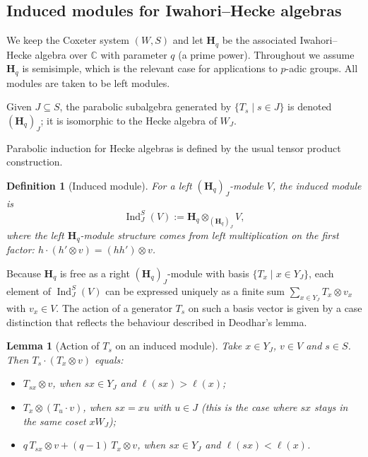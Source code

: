 \documentclass[12pt]{article}
\newtheorem{lemma}[theorem]{Lemma}
\newtheorem{definition}[theorem]{Definition}
\theoremstyle{remark}
\begin{document}
\subsection{Induced modules for Iwahori--Hecke algebras}

We keep the Coxeter system $(W,S)$ and let $\mathbf{H}_q$ be the associated Iwahori--Hecke algebra over $\mathbb{C}$ with parameter $q$ (a prime power). Throughout we assume $\mathbf{H}_q$ is semisimple, which is the relevant case for applications to $p$-adic groups. All modules are taken to be left modules.

Given $J\subseteq S$, the parabolic subalgebra generated by $\{T_s\mid s\in J\}$ is denoted $(\mathbf{H}_q)_J$; it is isomorphic to the Hecke algebra of $W_J$.

Parabolic induction for Hecke algebras is defined by the usual tensor product construction.

\begin{definition}[Induced module]
For a left $(\mathbf{H}_q)_J$-module $V$, the induced module is
\[
\operatorname{Ind}_J^S(V) := \mathbf{H}_q \otimes_{(\mathbf{H}_q)_J} V,
\]
where the left $\mathbf{H}_q$-module structure comes from left multiplication on the first factor: $h\cdot (h'\otimes v) = (hh')\otimes v$.
\end{definition}

Because $\mathbf{H}_q$ is free as a right $(\mathbf{H}_q)_J$-module with basis $\{T_x\mid x\in Y_J\}$, each element of $\operatorname{Ind}_J^S(V)$ can be expressed uniquely as a finite sum $\sum_{x\in Y_J} T_x \otimes v_x$ with $v_x\in V$. The action of a generator $T_s$ on such a basis vector is given by a case distinction that reflects the behaviour described in Deodhar's lemma.

\begin{lemma}[Action of $T_s$ on an induced module]\label{lem:Ts-action}
Take $x\in Y_J$, $v\in V$ and $s\in S$. Then $T_s\cdot (T_x\otimes v)$ equals:
\begin{itemize}
\item $T_{sx}\otimes v$, when $sx\in Y_J$ and $\ell(sx)>\ell(x)$;
\item $T_x \otimes (T_u\cdot v)$, when $sx = x u$ with $u\in J$ (this is the case where $sx$ stays in the same coset $x W_J$);
\item $q\, T_{sx}\otimes v + (q-1)\, T_x\otimes v$, when $sx\in Y_J$ and $\ell(sx)<\ell(x)$.
\end{itemize}
\end{lemma}
\end{document}
